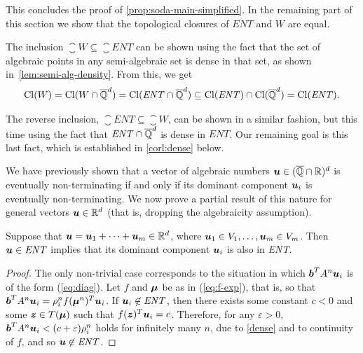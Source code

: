 This concludes the proof of \cref{prop:soda-main-simplified}.
In the remaining part of this section we show that the topological closures of
$\mathit{ENT}$ and $W$ are equal.

The inclusion $\closure{W}\subseteq \closure{ENT}$ can be shown
using the fact that the set of algebraic points in any semi-algebraic set
is dense in that set, as shown in~\cref{lem:semi-alg-density}.
From this, we get
\begin{align*}
\operatorname{Cl}(W)=\operatorname{Cl}(W\cap\overline{\mathbb{Q}}^{d})=\operatorname{Cl}(\mathit{ENT}\cap\overline{\mathbb{Q}}^{d}) \subseteq \operatorname{Cl}(\mathit{ENT})\cap\operatorname{Cl}(\overline{\mathbb{Q}}^{d})=\operatorname{Cl}(\mathit{ENT}) .
\end{align*}

The reverse inclusion, $\closure{ENT}\subseteq\closure{W}$, can be
shown in a similar fashion, but this time using the fact that
$\mathit{ENT}\cap\overline{\mathbb{Q}}^{d}$ is dense in $\mathit{ENT}$.  Our
remaining goal is this last fact, which is established in
\cref{corl:dense} below.

We have previously shown that a vector of algebraic numbers $\boldsymbol{u}\in (\overline{\mathbb{Q}}\cap\mathbb{R})^{d}$ is eventually non-terminating if and only if its dominant component $\boldsymbol{u}_i$ is eventually non-terminating. We now prove a partial result of this nature for general vectors $\boldsymbol{u} \in \mathbb{R}^{d}$ (that is, dropping the algebraicity assumption).

\begin{proposition}
  Suppose that $\boldsymbol u=\boldsymbol u_1+\cdots+\boldsymbol
  u_m\in \mathbb{R}^{d}$, where $\boldsymbol u_1\in
  V_1,\ldots,\boldsymbol u_m\in V_m$. Then $\boldsymbol
  u\in\mathit{ENT}$ implies that its dominant component $\boldsymbol
  u_i$ is also in \textit{ENT}.
\label{prop:dom2}
\end{proposition}
\begin{proof}
  The only non-trivial case corresponds to the situation in which
  $\boldsymbol b^T A^n \boldsymbol u_i$ is of the form (\ref{eq:diag}).
  Let $f$ and $\boldsymbol \mu$ be as in (\ref{eq:f-exp}), that is, so
  that $\boldsymbol b^T A^n \boldsymbol u_i=\rho_i^n f (\boldsymbol
  \mu^n)^T \boldsymbol u_i$. If $\boldsymbol u_i\not\in\mathit{ENT}$,
  then there exists some constant $c<0$ and some $\boldsymbol z\in T(\boldsymbol \mu)$ such that $f(\boldsymbol z)^T \boldsymbol u_i=c$. Therefore, for any $\varepsilon>0$, $\boldsymbol b^T A^n \boldsymbol u_i<(c+\varepsilon)\rho_i^n$ holds for infinitely many $n$, due to \cref{dense} and to continuity of $f$, and so $\boldsymbol u\not\in\mathit{ENT}$.
\end{proof}

